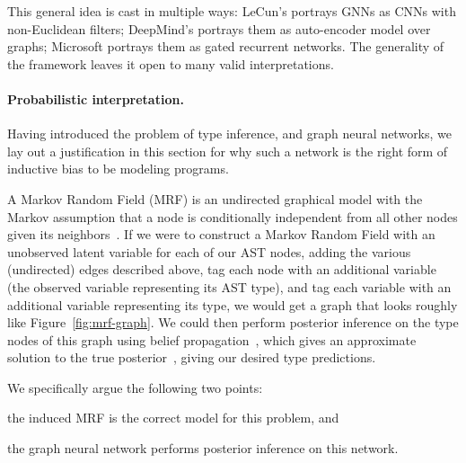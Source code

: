 This general idea is cast in multiple ways: LeCun's portrays GNNs as CNNs with non-Euclidean filters; DeepMind's portrays them as auto-encoder model over graphs; Microsoft portrays them as gated recurrent networks.
The generality of the framework leaves it open to many valid interpretations.


\paragraph{Probabilistic interpretation.}
Having introduced the problem of type inference, and graph neural networks, we lay out a justification in this section for why such a network is the right form of inductive bias to be modeling programs.

A Markov Random Field (MRF) is an undirected graphical model with the Markov assumption that a node is conditionally independent from all other nodes given its neighbors~\cite{kinderman80markov}.
If we were to construct a Markov Random Field with an unobserved latent variable for each of our AST nodes, adding the various (undirected) edges described above, tag each node with an additional variable (the observed variable representing its AST type), and tag each variable with an additional variable representing its type, we would get a graph that looks roughly like Figure~\ref{fig:mrf-graph}.
We could then perform posterior inference on the type nodes of this graph using belief propagation~\cite{pearl2009causality}, which gives an approximate solution to the true posterior~\cite{weiss2000correctness}, giving our desired type predictions.

We specifically argue the following two points:
\begin{enumerate*}[label=(\roman*)]
	\item the induced MRF is the correct model for this problem, and
	\item the graph neural network performs posterior inference on this network.
\end{enumerate*}

